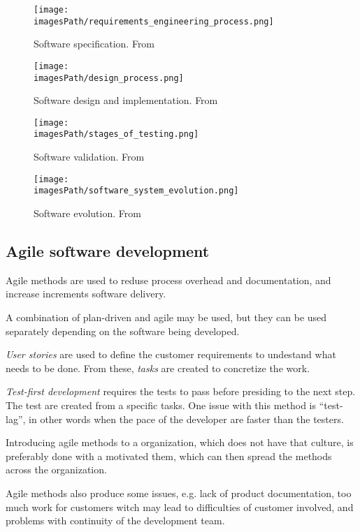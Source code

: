 \begin{figure}[!ht]
    \centering
    \texttt{[image: \\imagesPath/requirements\_engineering\_process.png]}
    \caption{Software specification. From \cite{}}
\end{figure}
\begin{figure}[!ht]
    \centering
    \texttt{[image: \\imagesPath/design\_process.png]}
    \caption{Software design and implementation. From \cite{}}
\end{figure}
\begin{figure}[!ht]
    \centering
    \texttt{[image: \\imagesPath/stages\_of\_testing.png]}
    \caption{Software validation. From \cite{}}
\end{figure}
\begin{figure}[!ht]
    \centering
    \texttt{[image: \\imagesPath/software\_system\_evolution.png]}
    \caption{Software evolution. From \cite{}}
\end{figure}


\subsection{Agile software development}
Agile methods are used to reduse process overhead and documentation, and
increase increments software delivery.

A combination of plan-driven and agile may be used, but they can be used
separately depending on the software being developed.

\textit{User stories} are used to define the customer requirements to
undestand what needs to be done. From these, \textit{tasks} are created
to concretize the work.

\textit{Test-first development} requires the tests to pass before presiding
to the next step. The test are created from a specific tasks.
One issue with this method is ``test-lag'', in other words
when the pace of the developer are faster than the testers.

Introducing agile methods to a organization, which does not have that culture,
is preferably done with a motivated them, which can then spread the methods
across the organization.

Agile methods also produce some issues, e.g. lack of product documentation,
too much work for customers witch may lead to difficulties of customer involved,
and problems with continuity of the development team.

